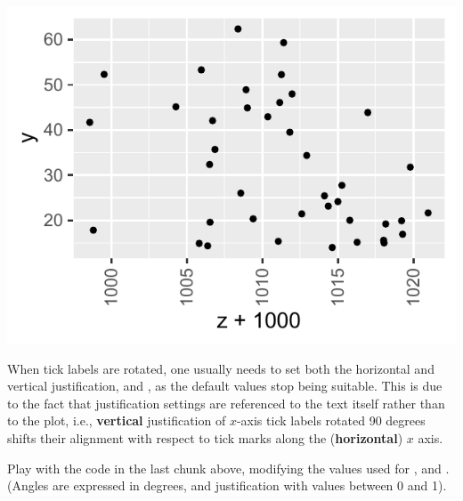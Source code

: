 \documentclass[krantz2]{krantz}\usepackage{knitr}
\begin{document}
\begin{knitrout}\footnotesize
{}\color{fgcolor}\begin{kframe}
\begin{alltt}
  \hlopt{+}  \hlopt{+}
  \hlstd{()} \hlopt{+}
  \hlstd{(} \hlopt{::}\hlstd{(} \hlstd{=} \hlstd{))} \hlopt{+}
  \hlstd{(} \hlstd{=} \hlstd{(} \hlstd{=} \hlstd{,}  \hlstd{=} \hlstd{,}  \hlstd{=} \hlstd{))}
\end{alltt}
\end{kframe}

{\centering \includegraphics[width=.54\textwidth]{figure/pos-themes-11-1}

}



\end{knitrout}

\begin{warningbox}
When tick labels are rotated, one usually needs to set both the horizontal and vertical justification,  and , as the default values stop being suitable. This is due to the fact that justification settings are referenced to the text itself rather than to the plot, i.e., \textbf{vertical} justification of $x$-axis tick labels rotated 90 degrees shifts their alignment with respect to tick marks along the (\textbf{horizontal}) $x$ axis.
\end{warningbox}

\begin{playground}
Play with the code in the last chunk above, modifying the values used for ,  and . (Angles are expressed in degrees, and justification with values between 0 and 1).
\end{playground}
\end{document}
